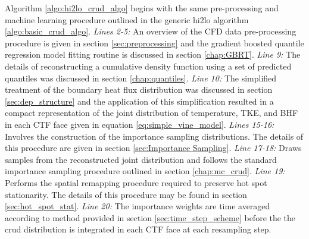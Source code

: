 Algorithm \ref{algo:hi2lo_crud_algo} begins with the same pre-processing and machine learning procedure outlined in the generic hi2lo algorithm \ref{algo:basic_crud_algo}.  \emph{Lines 2-5:} An overview of the CFD data pre-processing procedure is given in section \ref{sec:preprocessing} and the gradient boosted quantile regression model fitting routine is discussed in section \ref{chap:GBRT}.  \emph{Line 9:} The details of reconstructing a cumulative density function using a set of predicted quantiles was discussed in section \ref{chap:quantiles}.  \emph{Line 10:} The simplified treatment of the boundary heat flux distribution was discussed in section \ref{sec:dep_structure} and the application of this simplification resulted in a compact representation of the joint distribution of temperature, TKE, and BHF in each CTF face given in equation \ref{eq:simple_vine_model}.   \emph{Lines 15-16:} Involves the construction of the importance sampling distributions.  The details of this procedure are given in section \ref{sec:Importance Sampling}.   \emph{Line 17-18:} Draws samples from the reconstructed joint distribution and follows the standard importance sampling procedure outlined in section \ref{chap:mc_crud}.  \emph{Line 19:} Performs the spatial remapping procedure required to preserve hot spot stationarity.  The details of this procedure may be found in section \ref{sec:hot_spot_stat}.  \emph{Line 20:} The importance weights are time averaged according to method provided in section \ref{sec:time_step_scheme} before the the crud distribution is integrated in each CTF face at each resampling step.

